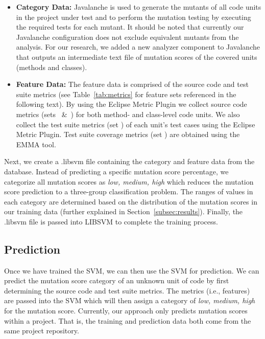 \documentclass[10pt,conference,compsocconf]{IEEEtran}
\begin{document}
\begin{itemize}
  \item \textbf{Category Data:} Javalanche is used to generate the mutants of all code units in the project under test and to perform the mutation testing by executing the required tests for each mutant. It should be noted that currently our Javalanche configuration does not exclude equivalent mutants from the analysis. For our research, we added a new analyzer component to Javalanche that outputs an intermediate text file of mutation scores of the covered units (methods and classes).

  \item \textbf{Feature Data:} The feature data is comprised of the source code and test suite metrics (see Table~\ref{tab:metrics} for feature sets referenced in the following text). By using the Eclipse Metric Plugin we collect source code metrics (sets ~\&~) for both method- and class-level code units. We also collect the test suite metrics (set ) of each unit's test cases using the Eclipse Metric Plugin. Test suite coverage metrics (set ) are obtained using the EMMA tool.
\end{itemize}

Next, we create a .libsvm file containing the category and feature data from the database. Instead of predicting a specific mutation score percentage, we categorize all mutation scores as \textit{low, medium, high} which reduces the mutation score prediction to a three-group classification problem. The ranges of values in each category are determined based on the distribution of the mutation scores in our training data (further explained in Section~\ref{subsec:results}). Finally, the .libsvm file is passed into LIBSVM to complete the training process.


\subsection{Prediction}
\label{subsec:prediction}
Once we have trained the SVM, we can then use the SVM for prediction. We can predict the mutation score category of an unknown unit of code by first determining the source code and test suite metrics. The metrics (i.e., features) are passed into the SVM which will then assign a category of \textit{low, medium, high} for the mutation score.  Currently, our approach only predicts mutation scores within a project. That is, the training and prediction data both come from the same project repository.
\end{document}
